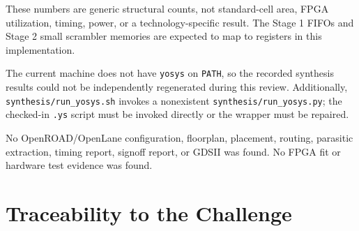 \documentclass[11pt,a4paper]{article}
\newcommand{\code}[1]{\texttt{#1}}
\begin{document}
These numbers are generic structural counts, not standard-cell area, FPGA utilization,
timing, power, or a technology-specific result. The Stage 1 FIFOs and Stage 2 small
scrambler memories are expected to map to registers in this implementation.

The current machine does not have \code{yosys} on \code{PATH}, so the recorded synthesis
results could not be independently regenerated during this review. Additionally,
\code{synthesis/run\_yosys.sh} invokes a nonexistent \code{synthesis/run\_yosys.py}; the
checked-in \code{.ys} script must be invoked directly or the wrapper must be repaired.

No OpenROAD/OpenLane configuration, floorplan, placement, routing, parasitic extraction,
timing report, signoff report, or GDSII was found. No FPGA fit or hardware test evidence was
found.

\section{Traceability to the Challenge}
\end{document}
